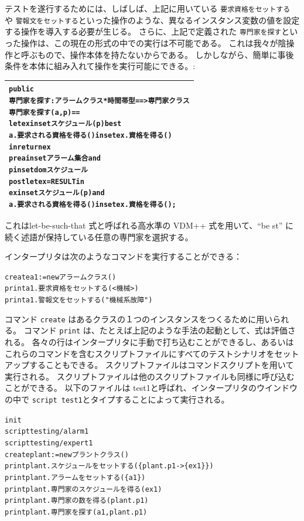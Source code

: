 \documentclass[\pformat,12pt,twoside]{jarticle}
\newenvironment{VDMgray}%
{\begin{tabular}{|G|}\hline\small\begin{alltt}}%
{\end{alltt}\normalsize\\
 \hline\end{tabular}}
\begin{document}
テストを遂行するためには、しばしば、上記に用いている \texttt{要求資格をセットする} や \texttt{警報文をセットする}といった操作のような、異なるインスタンス変数の値を設定する操作を導入する必要が生じる。
さらに、上記で定義された \texttt{専門家を探す}といった操作は、この現在の形式の中での実行は不可能である。
これは我々が陰操作と呼ぶもので、操作本体を持たないからである。
しかしながら、簡単に事後条件を本体に組み入れて操作を実行可能にできる。:

\begin{VDMgray}
  public
  専門家を探す : アラームクラス * 時間帯型 ==\texttt{>} 専門家クラス
  専門家を探す(a, p) ==
    let ex in set スケジュール(p) be st
        a.要求される資格を得る() in set ex.資格を得る()
    in return ex
  pre a in set アラーム集合 and
      p in set dom スケジュール
  post let ex = RESULT in
         ex in set スケジュール(p) and
         a.要求される資格を得る() in set ex.資格を得る();

\end{VDMgray}


これはlet-be-such-that 式と呼ばれる高水準の  VDM++ 式を用いて、``be st'' に続く述語が保持している任意の専門家を選択する。

インタープリタは次のようなコマンドを実行することができる：

\small
\begin{alltt}
  create a1:= new アラームクラス()
  print a1.要求資格をセットする(\texttt{<}機械\texttt{>})
  print a1.警報文をセットする("機械系故障")

\end{alltt}
\normalsize

コマンド \texttt{create} はあるクラスの１つのインスタンスをつくるために用いられる。
コマンド \texttt{print} は、たとえば上記のような手法の起動として、式は評価される。 
各々の行はインタープリタに手動で打ち込むことができるし、あるいはこれらのコマンドを含むスクリプトファイルにすべてのテストシナリオをセットアップすることもできる。
スクリプトファイルはコマンドスクリプトを用いて実行される。
スクリプトファイルは他のスクリプトファイルも同様に呼び込むことができる。
以下のファイルは test1と呼ばれ、インタープリタのウインドウの中で \texttt{script test1}とタイプすることによって実行される。

\small
\begin{alltt}
  init
  script testing/alarm1
  script testing/expert1
  create plant:= new プラントクラス()
  print plant.スケジュールをセットする(\{plant.p1 {\textbar}-\texttt{>} \{ex1\}\})
  print plant.アラームをセットする(\{a1\})
  print plant.専門家のスケジュールを得る(ex1)
  print plant.専門家の数を得る(plant.p1)
  print plant.専門家を探す(a1,plant.p1) 

\end{alltt}
\normalsize
\end{document}
